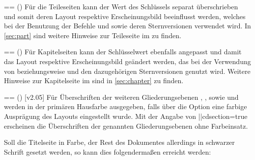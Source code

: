 \begin{DeclareEntity*}{}
\begin{DeclareEntity*}{}
\begin{DeclareEntity*}{}
\begin{Declaration}
  {}=\cdalias=
  ()
Für die Teileseiten kann der Wert des Schlüssels  separat 
überschrieben und somit deren Layout respektive Erscheinungsbild beeinflusst 
werden, welches bei der Benutzung der Befehle  und 
sowie deren Sternversionen verwendet wird. In \autoref{sec:part} sind weitere 
Hinweise zur Teileseite im 
\CD zu finden.
\end{Declaration}

\begin{Declaration}
  {}=\cdalias=
  ()
Für Kapitelseiten kann der Schlüsselwert  ebenfalls angepasst 
und damit das Layout respektive Erscheinungsbild geändert werden, das bei der 
Verwendung von  beziehungsweise  und den 
dazugehörigen Sternversionen genutzt wird. Weitere Hinweise zur Kapitelseite im 
\CD sind in \autoref{sec:chapter} zu finden.
\end{Declaration}

\begin{Declaration}
  {}=\cdalias=
  ()
  [v2.05]
\printdeclarationlist
%
Für Überschriften der weiteren Gliederungsebenen , 
,  sowie  und 
 werden in der primären Hausfarbe  ausgegeben, 
falls über die Option  eine farbige Ausprägung des Layouts 
eingestellt wurde. Mit der Angabe von \Option||{cdsection=true} erscheinen die 
Überschriften der genannten Gliederungsebenen ohne Farbeinsatz.%
%
\end{Declaration}
%
\begin{Example}
Soll die Titelseite in Farbe, der Rest des Dokumentes allerdings in schwarzer 
Schrift gesetzt werden, so kann dies folgendermaßen erreicht werden:
\end{Example}




\end{DeclareEntity*}
\end{DeclareEntity*}
\end{DeclareEntity*}
